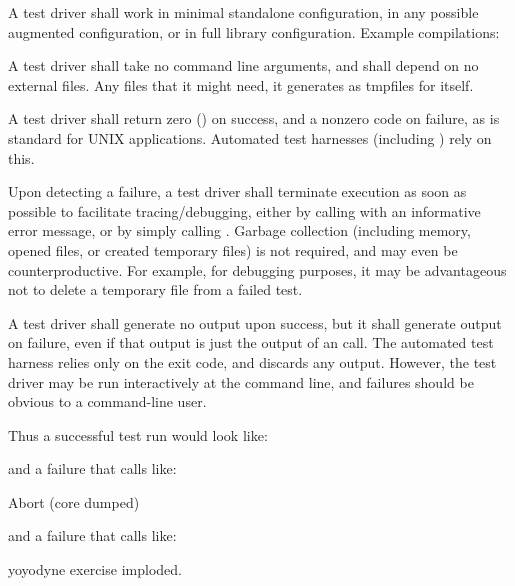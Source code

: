 A test driver shall work in minimal standalone configuration, in any
possible augmented configuration, or in full library
configuration. Example compilations:
\begin{cchunk}
\end{cchunk}

A test driver shall take no command line arguments, and shall depend
on no external files.  Any files that it might need, it generates as
tmpfiles for itself. 

A test driver shall return zero () on success, and a
nonzero code on failure, as is standard for UNIX
applications. Automated test harnesses (including ) rely on
this.

Upon detecting a failure, a test driver shall terminate execution as
soon as possible to facilitate tracing/debugging, either by calling
 with an informative error message, or by simply
calling . Garbage collection (including memory, opened
files, or created temporary files) is not required, and may even be
counterproductive.  For example, for debugging purposes, it may be
advantageous not to delete a temporary file from a failed test.

A test driver shall generate no output upon success, but it shall
generate output on failure, even if that output is just the output of
an  call.  The automated  test harness
relies only on the exit code, and discards any output.  However, the
test driver may be run interactively at the command line, and failures
should be obvious to a command-line user.

Thus a successful test run would look like:

\begin{cchunk}
\end{cchunk}

and a failure that calls  like:

\begin{cchunk}
      Abort (core dumped)
\end{cchunk}

and a failure that calls  like:

\begin{cchunk}
      yoyodyne exercise imploded.
\end{cchunk}

